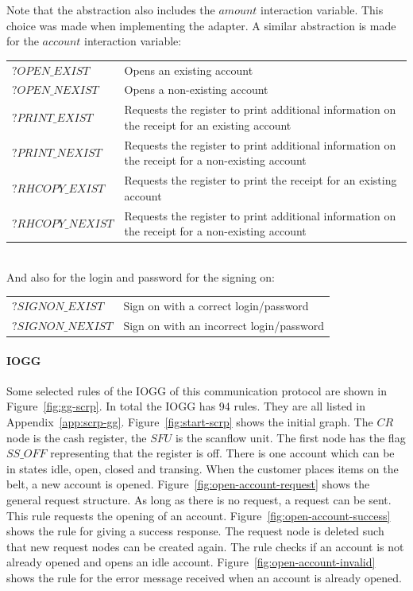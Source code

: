 Note that the abstraction also includes the $\mathit{amount}$ interaction variable. This choice was made when implementing the adapter. A similar abstraction is made for the $\mathit{account}$ interaction variable: 
\vspace{5px}\\
\begin{tabular}{lp{310px}}
$\mathit{?OPEN\_EXIST}$ & Opens an existing account \\
$\mathit{?OPEN\_NEXIST}$ & Opens a non-existing account \\
$\mathit{?PRINT\_EXIST}$ & Requests the register to print additional information on the receipt for an existing account \\
$\mathit{?PRINT\_NEXIST}$ & Requests the register to print additional information on the receipt for a non-existing account \\
$\mathit{?RHCOPY\_EXIST}$ & Requests the register to print the receipt for an existing account \\
$\mathit{?RHCOPY\_NEXIST}$ & Requests the register to print additional information on the receipt for a non-existing account \\
\end{tabular}
\vspace{5px} \\
And also for the login and password for the signing on: 
\vspace{5px}\\
\begin{tabular}{ll}
$\mathit{?SIGNON\_EXIST}$ & Sign on with a correct login/password \\
$\mathit{?SIGNON\_NEXIST}$ & Sign on with an incorrect login/password \\
\end{tabular}

\paragraph*{IOGG} Some selected rules of the IOGG of this communication protocol are shown in Figure~\ref{fig:gg-scrp}. In total the IOGG has 94 rules. They are all listed in Appendix~\ref{app:scrp-gg}. Figure~\ref{fig:start-scrp} shows the initial graph. The $CR$ node is the cash register, the $SFU$ is the scanflow unit. The first node has the flag $\mathit{SS\_OFF}$ representing that the register is off. There is one account which can be in states idle, open, closed and transing. When the customer places items on the belt, a new account is opened. Figure~\ref{fig:open-account-request} shows the general request structure. As long as there is no request, a request can be sent. This rule requests the opening of an account. Figure~\ref{fig:open-account-success} shows the rule for giving a success response. The request node is deleted such that new request nodes can be created again. The rule checks if an account is not already opened and opens an idle account. Figure~\ref{fig:open-account-invalid} shows the rule for the error message received when an account is already opened. 


